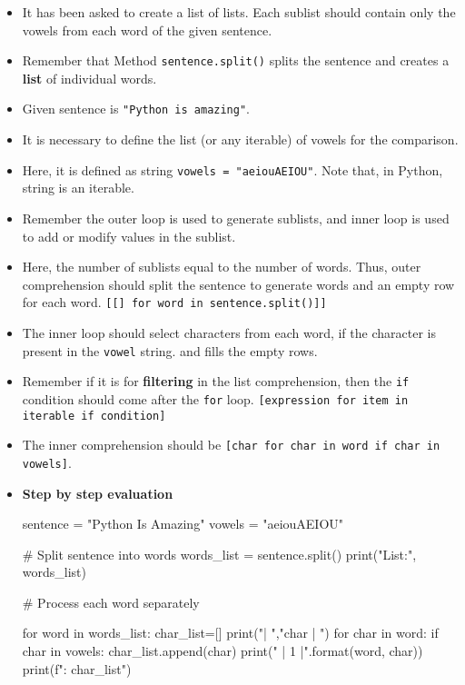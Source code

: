\documentclass[10pt]{extarticle}
\begin{document}
\begin{itemize}
    \item It has been asked to create a list of lists. Each sublist should contain only the vowels from each word of the given sentence.
    \item Remember that Method \colorbox{gray!20}{\texttt{sentence.split()}} splits the sentence and creates a \textbf{list} of individual words.
    \item Given sentence is \colorbox{gray!20}{\texttt{"Python is amazing"}}. 
    \item It is necessary to define the list (or any iterable) of vowels for the comparison. 
    \item Here, it is defined as string \colorbox{gray!20}{\texttt{vowels = "aeiouAEIOU"}}. Note that, in Python, string is an iterable. 
    \item Remember the outer loop is used to generate sublists, and inner loop is used to add or modify values in the sublist.
    \item Here, the number of sublists equal to the number of words. Thus, outer comprehension should split the sentence to generate words and an empty row for each word. \colorbox{gray!20}{\texttt{[[] for word in sentence.split()]]}} 
    \item The inner loop should select characters from each word, if the character is present in the \texttt{vowel} string. and fills the empty rows. 
    \item Remember if it is for \textbf{filtering} in the list comprehension, then the \texttt{if} condition should come after the \texttt{for} loop. \colorbox{gray!20}{\texttt{[expression for item in iterable if condition]}}  
    \item The inner comprehension should be \colorbox{gray!20}{\texttt{[char for char in word if char in vowels]}}.
    \item \textbf{Step by step evaluation}
    \begin{tcolorbox}[colback=gray!20, colframe=gray!50, sharp corners=southwest]
    \begin{pycode}
sentence = "Python Is Amazing"
vowels = "aeiouAEIOU"

# Split sentence into words
words_list = sentence.split()
print("\nWords List:", words_list)  

# Process each word separately

for word in words_list:
  char_list=[]
  print("\nword | ","char | ")
  for char in word:
    if char in vowels: 
      char_list.append(char)
      print(" | {1} |".format(word, char))
  print(f"\nSublist: {char_list}")  

    \end{pycode}
    \end{tcolorbox}
\end{itemize}
\end{document}
